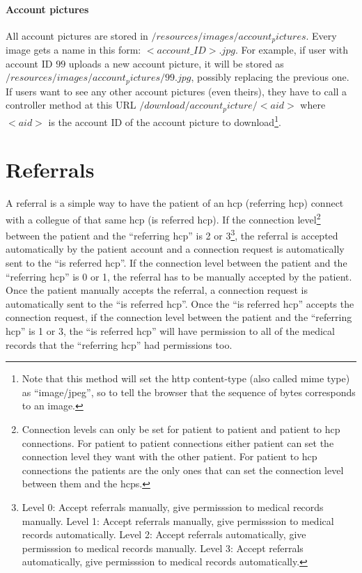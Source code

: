 \paragraph{Account pictures}
All account pictures are stored in $/resources/images/account_pictures$. Every image gets a name in this form: $<account{\_}ID>.jpg$. For example, if user with account ID $99$ uploads a new account picture, it will be stored as $/resources/images/account_pictures/99.jpg$, possibly replacing the previous one. If users want to see any other account pictures (even theirs), they have to call a controller method at this URL $/download/account_picture/<aid>$ where $<aid>$ is the account ID of the account picture to download\footnote{Note that this method will set the http content-type (also called mime type) as ``image/jpeg'', so to tell the browser that the sequence of bytes corresponds to an image.}.


\section{Referrals}
A referral is a simple way to have the patient of an hcp (referring hcp) connect with a collegue of that same hcp (is referred hcp).  If the connection level\footnote{Connection levels can only be set for patient to patient and patient to hcp connections.  For patient to patient connections either patient can set the connection level they want with the other patient.  For patient to hcp connections the patients are the only ones that can set the connection level between them and the hcps.} between the patient and the ``referring hcp'' is 2 or 3\footnote{ Level 0: Accept referrals manually, give permisssion to medical records manually. Level 1: Accept referrals manually, give permisssion to medical records automatically. Level 2: Accept referrals automatically, give permisssion to medical records manually. Level 3: Accept referrals automatically, give permisssion to medical records automatically.}, the referral is accepted automatically by the patient account and a connection request is automatically sent to the ``is referred hcp''.  If the connection level between the patient and the ``referring hcp'' is 0 or 1, the referral has to be manually accepted by the patient.  Once the patient manually accepts the referral, a connection request is automatically sent to the ``is referred hcp''.  Once the ``is referred hcp'' accepts the connection request, if the connection level between the patient and the ``referring hcp'' is 1 or 3, the ``is referred hcp'' will have permission to all of the medical records that the ``referring hcp'' had permissions too.

